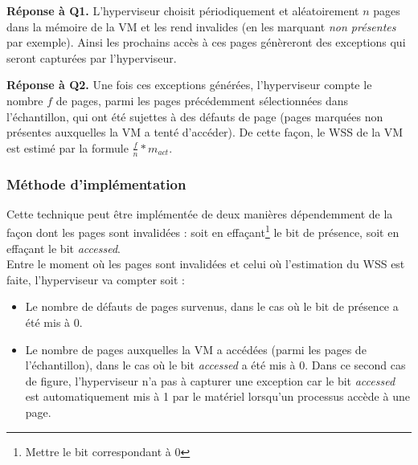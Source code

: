 \par{\textbf{Réponse à Q1.}} L'hyperviseur choisit périodiquement et aléatoirement $n$ pages dans la mémoire de la VM et les rend invalides (en les marquant \textit{non présentes} par exemple). Ainsi les prochains accès à ces pages génèreront des exceptions qui seront capturées par l'hyperviseur.

\par{\textbf{Réponse à Q2.}} Une fois ces exceptions générées, l'hyperviseur compte le nombre $f$ de pages, parmi les pages précédemment sélectionnées dans l'échantillon, qui ont été sujettes à des défauts de page (pages marquées non présentes auxquelles la VM a tenté d'accéder). De cette façon, le WSS de la VM est estimé par la formule $ \frac{f}{n}* \textit{m}_\textit{act} $.

\subsubsection{Méthode d'implémentation}
Cette technique peut être implémentée de deux manières dépendemment de la façon dont les pages sont invalidées : soit en effaçant\footnote{Mettre le bit correspondant à 0} le bit de présence, soit en effaçant le bit \textit{accessed}.\\
Entre le moment où les pages sont invalidées et celui où l'estimation du WSS est faite, l'hyperviseur va compter soit :
\begin{itemize}
    \item Le nombre de défauts de pages survenus, dans le cas où le bit de présence a été mis à 0.
    \item Le nombre de pages auxquelles la VM a accédées (parmi les pages de l'échantillon), dans le cas où le bit \textit{accessed} a été mis à 0. Dans ce second cas de figure, l'hyperviseur n'a pas à capturer une exception car le bit \textit{accessed} est automatiquement mis à 1 par le matériel lorsqu'un processus accède à une page.
\end{itemize}

